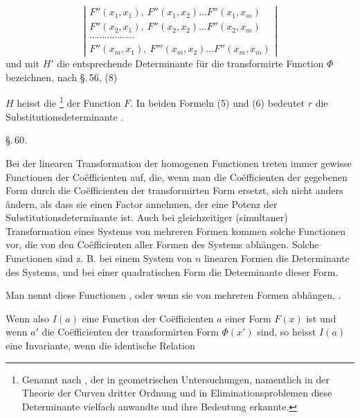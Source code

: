 \[
\left|
\begin{array}{l}
F''(x_1, x_1),\ F''(x_1, x_2)\ldots F''(x_1, x_m) \\
F''(x_2, x_1),\ F''(x_2, x_2)\ldots F''(x_2, x_m) \\
\cdots\cdots\cdots\cdots\cdots\cdots \\
F''(x_m, x_1),\ F'''(x_m, x_2)\ldots F''(x_m, x_m) %
\end{array}
\right|
\]
und mit $H'$ die entsprechende Determinante für die transformirte
Function $\Phi$ bezeichnen, nach \S.\,56, (8)


$H$ heisst die \footnote{Genannt nach , der in geometrischen Untersuchungen, namentlich in der Theorie der Curven dritter Ordnung und in Eliminationsproblemen diese Determinante vielfach anwandte und ihre Bedeutung erkannte.} der Function
$F$. In beiden Formeln (5) und (6) bedeutet $r$ die Substitutionsdeterminante
.

\begin{center}
\S.\,60.\\
\end{center}

Bei der linearen Transformation der homogenen Functionen
treten immer gewisse Functionen der Coëfficienten auf, die, wenn
man die Coëfficienten der gegebenen Form durch die Coëfficienten
der transformirten Form ersetzt, sich nicht anders ändern, als
dass sie einen Factor annehmen, der eine Potenz der Substitutionsdeterminante
 ist. Auch bei gleichzeitiger (simultaner) Transformation
 eines Systems von mehreren Formen kommen solche
Functionen vor, die von den Coëfficienten aller Formen des
Systems abhängen. Solche Functionen sind z. B. bei einem
System von $n$ linearen Formen die Determinante des Systems,
und bei einer quadratischen Form die Determinante dieser Form.

Man nennt diese Functionen , oder
wenn sie von mehreren Formen abhängen, .

Wenn also $I(a)$ eine Function der Coëfficienten $a$ einer
Form $F(x)$ ist und wenn $a'$ die Coëfficienten der transformirten
Form $\Phi(x')$ sind, so heisst $I(a)$ eine Invariante, wenn die identische Relation
